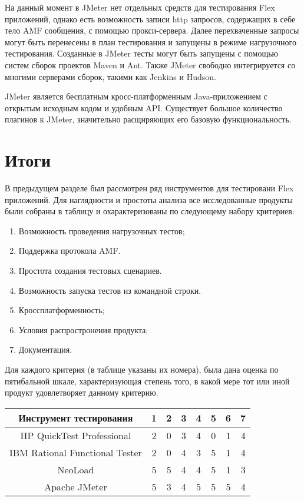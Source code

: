 На данный момент в JMeter нет отдельных средств для тестирования Flex приложений, 
однако есть возможность записи http запросов, содержащих в себе тело AMF 
сообщения, с помощью прокси-сервера. Далее перехваченные запросы могут быть 
перенесены в план тестирования и запущены в режиме нагрузочного тестирования. 
Созданные в JMeter тесты могут быть запущены с помощью систем сборок проектов Maven и 
Ant. Также JMeter свободно интегрируется со многими серверами сборок, такими как Jenkins 
и Hudson.

JMeter является бесплатным кросс-платформенным Java-приложением с открытым
исходным кодом и удобным API. Существует большое количество плагинов к JMeter, 
значительно расщиряющих его базовую функциональность.

\section{Итоги}

В предыдущем разделе был рассмотрен ряд инструментов для тестировани Flex приложений.
Для наглядности и простоты анализа все исследованные продукты были собраны в таблицу и 
охарактеризованы по следующему набору критериев:

\begin{enumerate}
\item Возможность проведения нагрузочных тестов; 
\item Поддержка протокола AMF.
\item Простота создания тестовых сценариев.
\item Возможность запуска тестов из командной строки.
\item Кроссплатформенность;
\item Условия распростронения продукта;
\item Документация.
\end{enumerate}

Для каждого критерия (в таблице указаны их номера), была дана оценка по пятибальной шкале, 
характеризующая степень того, в какой мере тот или иной продукт удовлетворяет данному критерию.

\begin{tabular}{|c|c|c|c|c|c|c|c|}
\hline 
Инструмент тестирования & 1 & 2 & 3 & 4 & 5 & 6 & 7\\
\hline 
HP QuickTest Professional & 2 & 0 & 3 & 4 & 0 & 1 & 4\\
\hline 
IBM Rational Functional Tester & 2 & 0 & 4 & 3 & 5 & 1 & 4\\
\hline 
NeoLoad & 5 & 5 & 4 & 4 & 5 & 1 & 3\\
\hline 
Apache JMeter & 5 & 3 & 4 & 5 & 5 & 5 & 4\\
\hline 
\end{tabular} 

